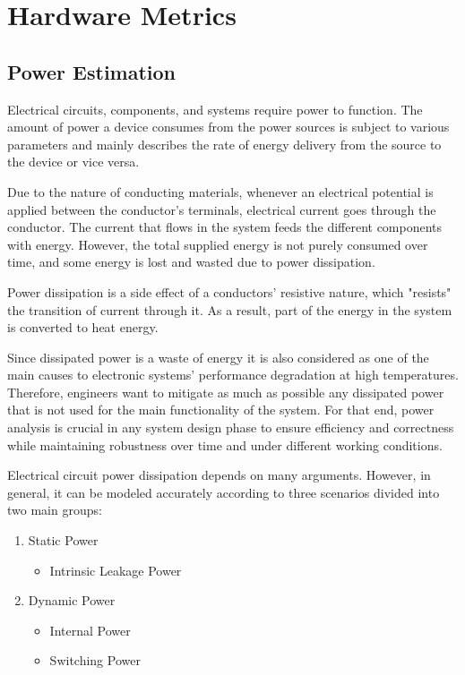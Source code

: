 \section{Hardware Metrics}
\subsection{Power Estimation}
Electrical circuits, components, and systems require power to function.
The amount of power a device consumes from the power sources is subject 
to various parameters and mainly describes the rate of energy delivery 
from the source to the device or vice versa.

Due to the nature of conducting materials, 
whenever an electrical potential is applied
between the conductor's terminals, 
electrical current goes through the conductor.
The current that flows
in the system feeds the different components with energy. 
However, the total supplied energy is not purely consumed over time, 
and some energy is lost and wasted due to power dissipation.

Power dissipation is a side effect of a conductors' resistive nature, 
which "resists" the transition of current through it.
As a result, part of the energy in the system is converted 
to heat energy.

Since dissipated power is a waste of energy it is also 
considered as one of the main causes 
to electronic systems' performance degradation at high temperatures.
Therefore, engineers want to mitigate 
as much as possible any dissipated power that
is not used for the main functionality of the system. %
For that end, power analysis is crucial in any system 
design phase to ensure efficiency and correctness while maintaining 
robustness over time and under different working conditions.

Electrical circuit power dissipation depends on many arguments. %
However, in general, it can be modeled 
accurately according to three scenarios divided into two main groups:
\begin{enumerate}
    \item Static Power
    \begin{itemize}
        \item Intrinsic Leakage Power
    \end{itemize}
    \item Dynamic Power
    \begin{itemize}
        \item Internal Power
        \item Switching Power
    \end{itemize}
\end{enumerate}

